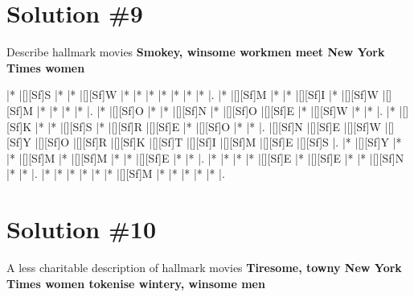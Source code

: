 \documentclass[letterpaper]{article}
\begin{document}
\newpage
\section*{Solution \#9}
Describe hallmark movies
\newline\textbf{Smokey, winsome workmen meet New York Times women}

\vspace*{1em}
\begin{Puzzle}{12}{8}
|*        |[][Sf]S  |*        |*        |[][Sf]W  |*        |*        |*        |*        |*        |*        |*        |.
|*        |[][Sf]M  |*        |*        |[][Sf]I  |*        |[][Sf]W  |[][Sf]M  |*        |*        |*        |*        |.
|*        |[][Sf]O  |*        |*        |[][Sf]N  |*        |[][Sf]O  |[][Sf]E  |*        |[][Sf]W  |*        |*        |.
|*        |[][Sf]K  |*        |*        |[][Sf]S  |*        |[][Sf]R  |[][Sf]E  |*        |[][Sf]O  |*        |*        |.
|[][Sf]N  |[][Sf]E  |[][Sf]W  |[][Sf]Y  |[][Sf]O  |[][Sf]R  |[][Sf]K  |[][Sf]T  |[][Sf]I  |[][Sf]M  |[][Sf]E  |[][Sf]S  |.
|*        |[][Sf]Y  |*        |*        |[][Sf]M  |*        |[][Sf]M  |*        |*        |[][Sf]E  |*        |*        |.
|*        |*        |*        |*        |[][Sf]E  |*        |[][Sf]E  |*        |*        |[][Sf]N  |*        |*        |.
|*        |*        |*        |*        |*        |*        |[][Sf]M  |*        |*        |*        |*        |*        |.
\end{Puzzle}

\newpage
\section*{Solution \#10}
A less charitable description of hallmark movies
\newline\textbf{Tiresome, towny New York Times women tokenise wintery, winsome men}
\end{document}
